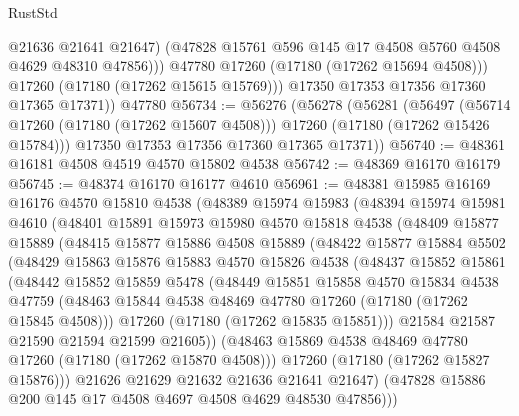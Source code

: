 \begin{lexlean}{RustStd}
\begin{coremodule}
                  @21636
                  @21641
                  @21647)
                (@47828 @15761 @596 @145 @17 @4508 @5760 @4508 @4629 @48310 @47856)))
            @47780
            @17260
            (@17180 (@17262 @15694 @4508)))
          @17260
          (@17180 (@17262 @15615 @15769)))
        @17350
        @17353
        @17356
        @17360
        @17365
        @17371))
    @47780
@56734 := @56276
    (@56278
      (@56281
        (@56497
          (@56714 @17260 (@17180 (@17262 @15607 @4508)))
          @17260
          (@17180 (@17262 @15426 @15784)))
        @17350
        @17353
        @17356
        @17360
        @17365
        @17371))
@56740 := @48361 @16181 @4508 @4519 @4570 @15802 @4538
@56742 := @48369 @16170 @16179
@56745 := @48374 @16170 @16177 @4610
@56961 := @48381
    @15985
    @16169
    @16176
    @4570
    @15810
    @4538
    (@48389
      @15974
      @15983
      (@48394
        @15974
        @15981
        @4610
        (@48401
          @15891
          @15973
          @15980
          @4570
          @15818
          @4538
          (@48409
            @15877
            @15889
            (@48415
              @15877
              @15886
              @4508
              @15889
              (@48422
                @15877
                @15884
                @5502
                (@48429
                  @15863
                  @15876
                  @15883
                  @4570
                  @15826
                  @4538
                  (@48437
                    @15852
                    @15861
                    (@48442
                      @15852
                      @15859
                      @5478
                      (@48449
                        @15851
                        @15858
                        @4570
                        @15834
                        @4538
                        @47759
                        (@48463 @15844 @4538 @48469 @47780 @17260 (@17180 (@17262 @15845 @4508)))
                        @17260
                        (@17180 (@17262 @15835 @15851)))
                      @21584
                      @21587
                      @21590
                      @21594
                      @21599
                      @21605))
                  (@48463 @15869 @4538 @48469 @47780 @17260 (@17180 (@17262 @15870 @4508)))
                  @17260
                  (@17180 (@17262 @15827 @15876)))
                @21626
                @21629
                @21632
                @21636
                @21641
                @21647)
              (@47828 @15886 @200 @145 @17 @4508 @4697 @4508 @4629 @48530 @47856)))

\end{coremodule}
\end{lexlean}
